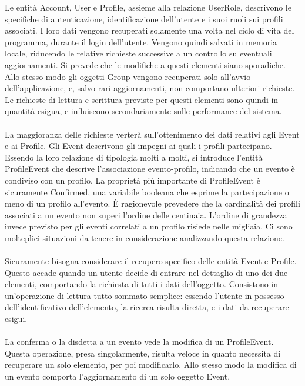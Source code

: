 \clearpage
Le entità Account, User e Profile, assieme alla relazione UserRole,
descrivono le specifiche di autenticazione, identificazione dell'utente e i suoi ruoli sui profili associati.
I loro dati vengono recuperati solamente una volta nel ciclo di vita del programma,
durante il login dell'utente.
Vengono quindi salvati in memoria locale,
riducendo le relative richieste successive a un controllo su eventuali aggiornamenti.
Si prevede che le modifiche a questi elementi siano sporadiche.\\
Allo stesso modo gli oggetti Group vengono recuperati solo all'avvio dell'applicazione, e,
salvo rari aggiornamenti, non comportano ulteriori richieste.
Le richieste di lettura e scrittura previste per questi elementi sono quindi in quantità esigua,
e influiscono secondariamente sulle performance del sistema.\\
\\
La maggioranza delle richieste verterà sull'ottenimento dei dati relativi agli Event e ai Profile.
Gli Event descrivono gli impegni ai quali i profili partecipano.
Essendo la loro relazione di tipologia molti a molti,
si introduce l'entità ProfileEvent che descrive l'associazione evento-profilo,
indicando che un evento è condiviso con un profilo.
La proprietà più importante di ProfileEvent è sicuramente Confirmed,
una variabile booleana che esprime la partecipazione o meno di un profilo all'evento.
È ragionevole prevedere che la cardinalità dei profili associati a un evento non superi l'ordine delle centinaia.
L'ordine di grandezza invece previsto per gli
eventi correlati a un profilo risiede nelle migliaia.
Ci sono molteplici situazioni da tenere in considerazione analizzando questa relazione.\\
\\
Sicuramente bisogna considerare il recupero specifico delle entità Event e Profile.
Questo accade quando un utente decide di entrare nel dettaglio di uno dei due elementi,
comportando la richiesta di tutti i dati dell'oggetto.
Consistono in un'operazione di lettura tutto sommato semplice:
essendo l'utente in possesso dell'identificativo dell'elemento,
la ricerca risulta diretta, e i dati da recuperare esigui.\\
\\
La conferma o la disdetta a un evento vede la modifica di un ProfileEvent.
Questa operazione, presa singolarmente, risulta veloce
in quanto necessita di recuperare un solo elemento, per poi modificarlo.
Allo stesso modo la modifica di un evento comporta l'aggiornamento di un solo oggetto Event,
